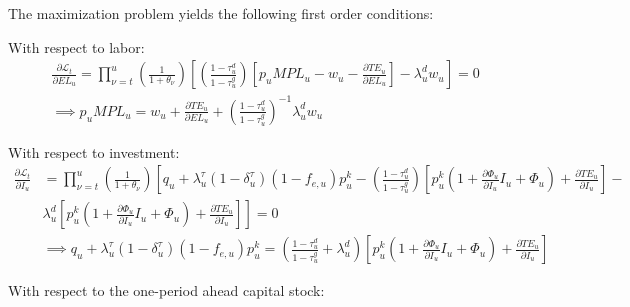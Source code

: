 The maximization problem yields the following first order conditions:

With respect to labor:
\begin{equation}
\label{eqn:foc_l}
\begin{split}
&\frac{\partial \mathcal{L}_{t}}{\partial EL_{u}} = \prod_{\nu=t}^{u}\left(\frac{1}{1+\theta_{\nu}}\right)\left[ \left(\frac{1-\tau^{d}_{u}}{1-\tau^{g}_{u}}\right)\left[p_{u}MPL_{u} - w_{u} - \frac{\partial TE_{u}}{\partial EL_{u}}\right] - \lambda^{d}_{u}w_{u} \right] = 0  \\
& \implies  p_{u}MPL_{u} = w_{u} + \frac{\partial TE_{u}}{\partial EL_{u}} + \left(\frac{1-\tau^{d}_{u}}{1-\tau^{g}_{u}}\right)^{-1}\lambda^{d}_{u}w_{u}
\end{split}
\end{equation}


With respect to investment:
 \begin{equation}
\label{eqn:foc_i}
\begin{split}
\frac{\partial \mathcal{L}_{t}}{\partial I_{u}} & =  \prod_{\nu=t}^{u}\left(\frac{1}{1+\theta_{\nu}}\right) \left[ q_{u} + \lambda^{\tau}_{u}(1-\delta^{\tau}_{u})(1-f_{e,u})p^{k}_{u} -  \left(\frac{1-\tau^{d}_{u}}{1-\tau^{g}_{u}}\right) \left[p^{k}_{u}(1+ \frac{\partial \Phi_{u}}{\partial I_{u}}I_{u} + \Phi_{u}) + \frac{\partial TE_{u}}{\partial I_{u}} \right] - \right. \\
& \left. \lambda^{d}_{u}\left[p^{k}_{u}(1+ \frac{\partial \Phi_{u}}{\partial I_{u}}I_{u} + \Phi_{u}) + \frac{\partial TE_{u}}{\partial I_{u}} \right]\right]= 0 \\
& \implies q_{u} + \lambda^{\tau}_{u}(1-\delta^{\tau}_{u})(1-f_{e,u})p^{k}_{u} =  \left(\frac{1-\tau^{d}_{u}}{1-\tau^{g}_{u}} + \lambda^{d}_{u}\right)\left[p^{k}_{u}(1+ \frac{\partial \Phi_{u}}{\partial I_{u}}I_{u} + \Phi_{u}) + \frac{\partial TE_{u}}{\partial I_{u}}\right]
\end{split}
\end{equation}

With respect to the one-period ahead capital stock:

